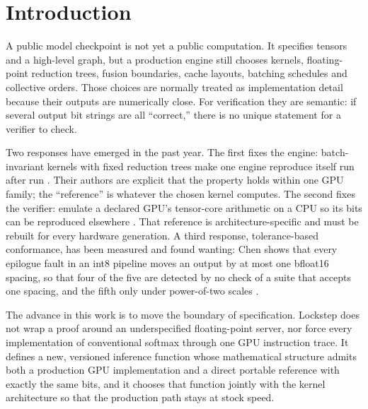 \documentclass{article}
\begin{document}
\section{Introduction}
\label{sec:introduction}

A public model checkpoint is not yet a public computation.  It specifies tensors and a
high-level graph, but a production engine still chooses kernels, floating-point reduction
trees, fusion boundaries, cache layouts, batching schedules and collective orders.  Those
choices are normally treated as implementation detail because their outputs are numerically
close.  For verification they are semantic: if several output bit strings are all
``correct,'' there is no unique statement for a verifier to check.

Two responses have emerged in the past year.  The first fixes the engine: batch-invariant
kernels with fixed reduction trees make one engine reproduce itself run after run
\cite{he2025nondeterminism,sglang2025deterministic,eigenai2026,llm42}.  Their authors are
explicit that the property holds within one GPU family; the ``reference'' is whatever the
chosen kernel computes.  The second fixes the verifier: emulate a declared GPU's tensor-core
arithmetic on a CPU so its bits can be reproduced elsewhere \cite{badash2026hawkeye,mmasim2025,
cankaya2026bitexact}.  That reference is architecture-specific and must be rebuilt for every
hardware generation.  A third response, tolerance-based conformance, has been measured and
found wanting: Chen shows that every epilogue fault in an int8 pipeline moves an output by at
most one bfloat16 spacing, so that four of the five are detected by no check of a suite that
accepts one spacing, and the fifth only under power-of-two scales \cite{chen2026pow2}.

The advance in this work is to move the boundary of specification.  Lockstep does not wrap a
proof around an underspecified floating-point server, nor force every implementation of
conventional softmax through one GPU instruction trace.  It defines a new, versioned
inference function whose mathematical structure admits both a production GPU implementation
and a direct portable reference with exactly the same bits, and it chooses that function
jointly with the kernel architecture so that the production path stays at stock speed.
\end{document}
